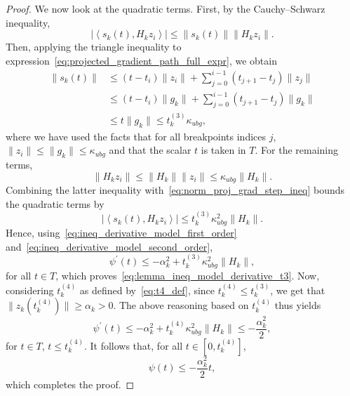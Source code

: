 \documentclass{article}
\numberwithin{equation}{section}
\newcommand{\inner}[2]{\left\langle {#1} , {#2} \right\rangle} %
\theoremstyle{plain}
\begin{document}
\begin{proof}
		We now look at the quadratic terms. First, by the Cauchy--Schwarz inequality,
		\begin{equation*}
			\left|\inner{s_k(t)}{H_kz_i}\right| \le \|s_k(t)\| \|H_kz_i\|.
		\end{equation*}
		Then, applying the triangle inequality to expression~\eqref{eq:projected_gradient_path_full_expr}, we obtain
		\begin{equation}\label{eq:norm_proj_grad_step_ineq}
			\begin{split}
				\|s_k(t)\| & \le (t-t_i) \|z_i\| + \sum_{j=0}^{i-1} (t_{j+1}-t_j)\|z_j\| \\
				& \le (t-t_i) \|g_k\| + \sum_{j=0}^{i-1} (t_{j+1}-t_j)\|g_k\| \\
				& \le t\|g_k\| \le t_k^{(3)}\kappa_{ubg},
			\end{split}
		\end{equation}
		where we have used the facts that for all breakpoints indices $j$, $\|z_i\| \le \|g_k\| \le \kappa_{ubg}$ and that the scalar $t$ is taken in $T$. For the remaining terms,
		\begin{equation*}
			\|H_kz_i\| \le \|H_k\| \|z_i\| \le \kappa_{ubg}\|H_k\|.
		\end{equation*}
		Combining the latter inequality with~\eqref{eq:norm_proj_grad_step_ineq} bounds the quadratic terms by
		\begin{equation}\label{eq:ineq_derivative_model_second_order}
			\left|\inner{s_k(t)}{H_kz_i}\right| \le t_k^{(3)} \kappa_{ubg}^2 \|H_k\|.
		\end{equation}
		Hence, using~\eqref{eq:ineq_derivative_model_first_order} and~\eqref{eq:ineq_derivative_model_second_order},
		\begin{equation*}
			\psi^\prime(t) \le -\alpha_k^2 + t_k^{(3)} \kappa_{ubg}^2 \|H_k\|,
		\end{equation*}
		for all $t \in T$, which proves~\eqref{eq:lemma_ineq_model_derivative_t3}.
		Now, considering $t_k^{(4)}$ as defined by~\eqref{eq:t4_def}, since $t_k^{(4)} \le t_k^{(3)}$, we get that $\|z_k(t_k^{(4)})\| \ge \alpha_k > 0$. The above reasoning based on $t_k^{(4)}$ thus yields
		\begin{equation*}
			\psi^\prime(t) \le -\alpha_k^2 + t_k^{(4)} \kappa_{ubg}^2 \|H_k\| \le -\dfrac{\alpha_k^2}{2},
		\end{equation*}
		for $t\in T$, $t\le t_k^{(4)}$. It follows that, for all $t\in [0,t_k^{(4)}]$,
		\begin{equation*}
			\psi(t) \le -\dfrac{\alpha_k^2}{2}t,
		\end{equation*}
		which completes the proof.
	\end{proof}
	
\end{document}
